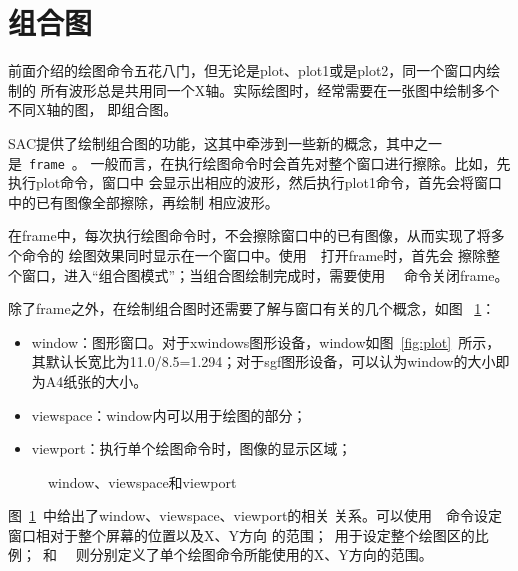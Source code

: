 \section{组合图}
\label{sec:composite-plots}

前面介绍的绘图命令五花八门，但无论是plot、plot1或是plot2，同一个窗口内绘制的
所有波形总是共用同一个X轴。实际绘图时，经常需要在一张图中绘制多个不同X轴的图，
即组合图。

SAC提供了绘制组合图的功能，这其中牵涉到一些新的概念，其中之一是~\lstinline{frame}~。
一般而言，在执行绘图命令时会首先对整个窗口进行擦除。比如，先执行plot命令，窗口中
会显示出相应的波形，然后执行plot1命令，首先会将窗口中的已有图像全部擦除，再绘制
相应波形。

在frame中，每次执行绘图命令时，不会擦除窗口中的已有图像，从而实现了将多个命令的
绘图效果同时显示在一个窗口中。使用~~打开frame时，首先会
擦除整个窗口，进入``组合图模式''；当组合图绘制完成时，需要使用~~
命令关闭frame。

除了frame之外，在绘制组合图时还需要了解与窗口有关的几个概念，如图
~\ref{fig:window-viewspace-viewport}：
\begin{itemize}
\item window：图形窗口。对于xwindows图形设备，window如图~\ref{fig:plot}~所示，
    其默认长宽比为11.0/8.5=1.294；对于sgf图形设备，可以认为window的大小即为A4纸张的大小。
\item viewspace：window内可以用于绘图的部分；
\item viewport：执行单个绘图命令时，图像的显示区域；
\end{itemize}

\begin{figure}[H]
\centering
{}
\caption{window、viewspace和viewport}
\label{fig:window-viewspace-viewport}
\end{figure}

图~\ref{fig:window-viewspace-viewport}~中给出了window、viewspace、viewport的相关
关系。可以使用~~命令设定窗口相对于整个屏幕的位置以及X、Y方向
的范围；~用于设定整个绘图区的比例；~和
~~则分别定义了单个绘图命令所能使用的X、Y方向的范围。


